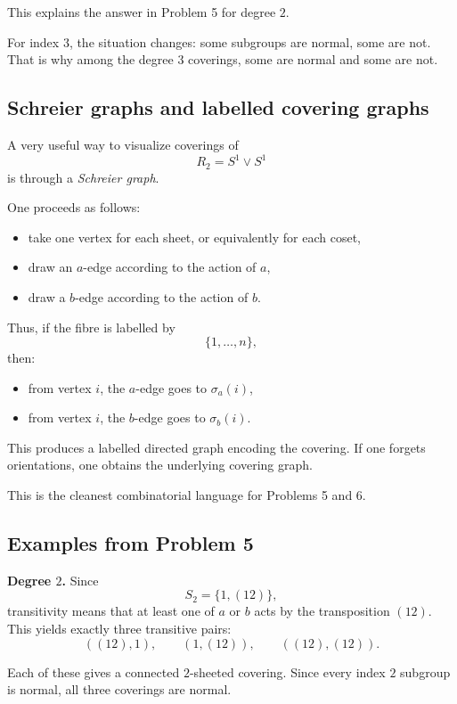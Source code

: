 \documentclass[12pt,a4paper]{article}
\theoremstyle{notespace}
\begin{document}
This explains the answer in Problem 5 for degree \(2\).

For index \(3\), the situation changes: some subgroups are normal, some are not. That is why among the degree \(3\) coverings, some are normal and some are not.

\bigskip

\subsection{Schreier graphs and labelled covering graphs}

A very useful way to visualize coverings of
\[
R_2=S^1\vee S^1
\]
is through a \emph{Schreier graph}.

One proceeds as follows:
\begin{itemize}
	\item take one vertex for each sheet, or equivalently for each coset,
	\item draw an \(a\)-edge according to the action of \(a\),
	\item draw a \(b\)-edge according to the action of \(b\).
\end{itemize}

Thus, if the fibre is labelled by
\[
\{1,\dots,n\},
\]
then:
\begin{itemize}
	\item from vertex \(i\), the \(a\)-edge goes to \(\sigma_a(i)\),
	\item from vertex \(i\), the \(b\)-edge goes to \(\sigma_b(i)\).
\end{itemize}

This produces a labelled directed graph encoding the covering. If one forgets orientations, one obtains the underlying covering graph.

This is the cleanest combinatorial language for Problems 5 and 6.

\bigskip

\subsection{ Examples from Problem 5}

\textbf{Degree \(2\).}
Since
\[
S_2=\{1,(12)\},
\]
transitivity means that at least one of \(a\) or \(b\) acts by the transposition \((12)\). This yields exactly three transitive pairs:
\[
((12),1),\qquad (1,(12)),\qquad ((12),(12)).
\]

Each of these gives a connected \(2\)-sheeted covering. Since every index \(2\) subgroup is normal, all three coverings are normal.
\end{document}
